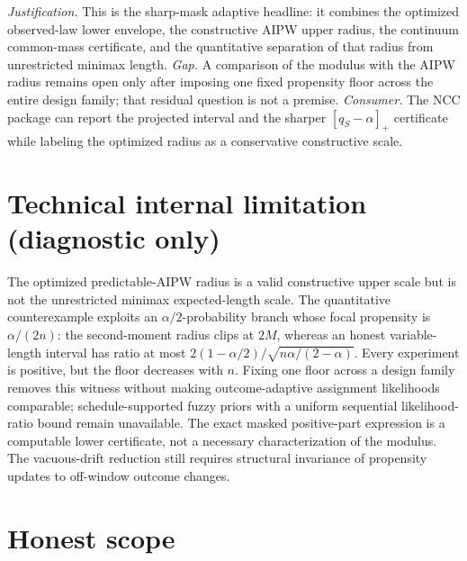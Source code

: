 \documentclass{article}
\begin{document}
\par\smallskip\noindent \textit{Justification.} This is the sharp-mask adaptive headline: it combines the optimized observed-law lower envelope, the constructive AIPW upper radius, the continuum common-mass certificate, and the quantitative separation of that radius from unrestricted minimax length. \textit{Gap.} A comparison of the modulus with the AIPW radius remains open only after imposing one fixed propensity floor across the entire design family; that residual question is not a premise. \textit{Consumer.} The NCC package can report the projected interval and the sharper \([q_S-\alpha]_+\) certificate while labeling the optimized radius as a conservative constructive scale.

\section*{Technical internal limitation (diagnostic only)}

The optimized predictable-AIPW radius is a valid constructive upper scale but is not the unrestricted minimax expected-length scale. The quantitative counterexample exploits an \(\alpha/2\)-probability branch whose focal propensity is \(\alpha/(2n)\): the second-moment radius clips at \(2M\), whereas an honest variable-length interval has ratio at most \(2(1-\alpha/2)/\sqrt{n\alpha/(2-\alpha)}\). Every experiment is positive, but the floor decreases with \(n\). Fixing one floor across a design family removes this witness without making outcome-adaptive assignment likelihoods comparable; schedule-supported fuzzy priors with a uniform sequential likelihood-ratio bound remain unavailable. The exact masked positive-part expression is a computable lower certificate, not a necessary characterization of the modulus. The vacuous-drift reduction still requires structural invariance of propensity updates to off-window outcome changes.

\section{Honest scope}
\end{document}

